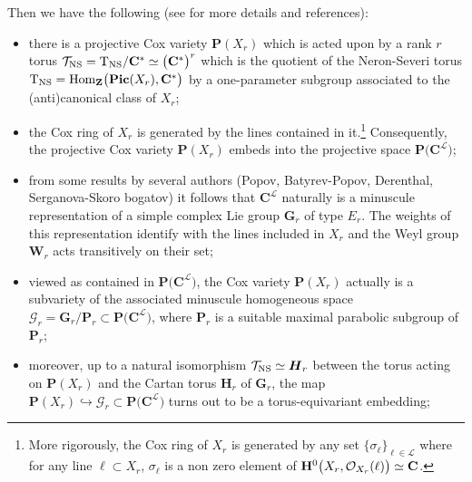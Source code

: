 \documentclass[11pt]{amsart}
\newcommand{\sk}{\smallskip}
\newcommand{\mk}{\medskip}
\begin{document}
 Then we have the following  (see \cite[\S4.5.2]{PirioAFST} for more details and references): \sk
 \begin{itemize}
  \item there is a projective Cox variety $\mathbf P(X_r)$ which is acted upon by a rank $r$ torus $\mathcal T_{\rm NS}= {\rm T}_{\rm NS}/\mathbf C^*\simeq \big(  \mathbf C^*
\big)^r  
  $ which is the quotient of the Neron-Severi torus 
  ${\rm T}_{\rm NS}={\rm Hom}_{\mathbf Z}\big( {\bf Pic}(X_r),\mathbf C^* \big)$  by a one-parameter subgroup associated to the (anti)canonical class 
 of $X_r$;
 \mk 
    \item the Cox ring of $X_r$ is generated by the lines contained in it.\footnote{More rigorously, the Cox ring of $X_r$ 
is generated by any set  $\{ \sigma_\ell\}_{ \ell\in \boldsymbol{\mathcal L} } $ where for any line $\ell \subset X_r$,  $\sigma_\ell$ is a non zero element of
${\bf H}^0\big(X_r, \mathcal O_{ X_r } (\ell) 
\big)\simeq \mathbf C$.} Consequently,  the projective Cox variety ${\mathbf P}(X_r)$ embeds into the projective space $\mathbf P\big(\mathbf C^{\boldsymbol{\mathcal L}} \big)$; 
\mk   
 \item from some results by 
several authors (Popov, Batyrev-Popov, Derenthal, Serganova-Skoro\- bogatov)  it follows that  $\mathbf C^{\boldsymbol{\mathcal L}}$ naturally is a minuscule representation of a simple complex Lie group $\boldsymbol{G}_r$ of type $E_r$. 
The weights of this representation identify with the lines included in $X_r$ and the 
Weyl group $\boldsymbol{W}_r$ acts transitively on their set;
\mk   
 \item viewed as contained in $\mathbf P\big(\mathbf C^{\boldsymbol{\mathcal L}} \big)$, the Cox variety ${\mathbf P}(X_r)$ actually is a subvariety of 
the associated minuscule homogeneous space $\boldsymbol{\mathcal G}_r=\boldsymbol{G}_r/\boldsymbol{P}_r \subset \mathbf P\big(\mathbf C^{\boldsymbol{\mathcal L}} 
\big) $, where $\boldsymbol{P}_r$ is a suitable maximal parabolic subgroup of $\boldsymbol{P}_r$; 
\mk 
 \item moreover, up to a natural isomorphism $\mathcal T_{\rm NS}\simeq \boldsymbol{H}_r$ between the torus acting on  ${\mathbf P}(X_r)$ and the Cartan torus $\boldsymbol{H}_r$ of $\boldsymbol{G}_r$, the 
map $\mathbf P(X_r)\hookrightarrow \boldsymbol{\mathcal G}_r \subset \mathbf P\big(\mathbf C^{\boldsymbol{\mathcal L}} \big)$ turns out to be a torus-equivariant embedding; 

\end{itemize}
\end{document}

